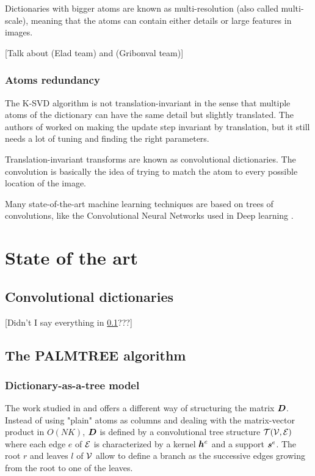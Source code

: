 Dictionaries with bigger atoms are known as multi-resolution (also called multi-scale), meaning that the atoms can contain either details or large features in images.

[Talk about \cite{magoarou_learning_2015} (Elad team) and \cite{sulam_trainlets:_2016} (Gribonval team)]

\subsection{Atoms redundancy} \label{sec_atoms_redund}
The K-SVD algorithm is not translation-invariant in the sense that multiple atoms of the dictionary can have the same detail but slightly translated. The authors of \cite{mailhe_shift-invariant_2008} worked on making the update step invariant by translation, but it still needs a lot of tuning and finding the right parameters. 

Translation-invariant transforms are known as convolutional dictionaries. The convolution is basically the idea of trying to match the atom to every possible location of the image.

Many state-of-the-art machine learning techniques are based on trees of convolutions, like the Convolutional Neural Networks used in Deep learning \cite{lecun_deep_2015}.


\chapter{State of the art}

\section{Convolutional dictionaries}
[Didn't I say everything in \cref{sec_atoms_redund}???]

\section{The PALMTREE algorithm}

\subsection{Dictionary-as-a-tree model \label{sec_tree_model}}
The work studied in \cite{chabiron_toward_2015} and \cite{chabiron_optimization_2016} offers a different way of structuring the matrix $\bm{D}$. Instead of using "plain" atoms as columns and dealing with the matrix-vector product in $O(NK)$, $\bm{D}$ is defined by a convolutional tree structure $\mathcal T(\mathcal V,\mathcal E)$ where each edge $e$ of $\mathcal E$ is characterized by a kernel $\bm{h}^e$ and a support $\bm{s}^e$. The root $r$ and leaves $l$ of $\mathcal V$ allow to define a branch as the successive edges growing from the root to one of the leaves.

